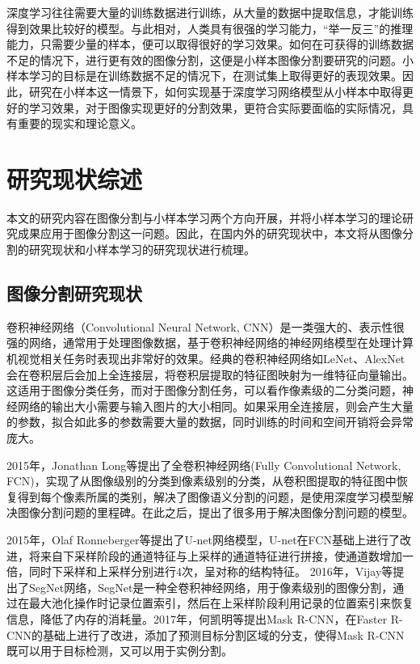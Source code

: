 \documentclass[AutoFakeBold]{LZUThesis}
\begin{document}
深度学习往往需要大量的训练数据进行训练，从大量的数据中提取信息，才能训练得到效果比较好的模型。与此相对，人类具有很强的学习能力，“举一反三”的推理能力，只需要少量的样本，便可以取得很好的学习效果。如何在可获得的训练数据不足的情况下，进行更有效的图像分割，这便是小样本图像分割要研究的问题。小样本学习的目标是在训练数据不足的情况下，在测试集上取得更好的表现效果。因此，研究在小样本这一情景下，如何实现基于深度学习网络模型从小样本中取得更好的学习效果，对于图像实现更好的分割效果，更符合实际要面临的实际情况，具有重要的现实和理论意义。


\section{研究现状综述}
本文的研究内容在图像分割与小样本学习两个方向开展，并将小样本学习的理论研究成果应用于图像分割这一问题。因此，在国内外的研究现状中，本文将从图像分割的研究现状和小样本学习的研究现状进行梳理。
\subsection{图像分割研究现状}
卷积神经网络（Convolutional Neural Network, CNN）是一类强大的、表示性很强的网络，通常用于处理图像数据，基于卷积神经网络的神经网络模型在处理计算机视觉相关任务时表现出非常好的效果。经典的卷积神经网络如LeNet\textsuperscript{\cite{lecun1989handwritten}}、AlexNet\textsuperscript{\cite{krizhevsky2012imagenet}}会在卷积层后会加上全连接层，将卷积层提取的特征图映射为一维特征向量输出。这适用于图像分类任务，而对于图像分割任务，可以看作像素级的二分类问题，神经网络的输出大小需要与输入图片的大小相同。如果采用全连接层，则会产生大量的参数，拟合如此多的参数需要大量的数据，同时训练的时间和空间开销将会异常庞大。

2015年，Jonathan Long等提出了全卷积神经网络(Fully Convolutional Network, FCN)\textsuperscript{\cite{long2015fully}}，实现了从图像级别的分类到像素级别的分类，从卷积图提取的特征图中恢复得到每个像素所属的类别，解决了图像语义分割的问题，是使用深度学习模型解决图像分割问题的里程碑。在此之后，提出了很多用于解决图像分割问题的模型\textsuperscript{\cite{minaee2021image}}。

2015年，Olaf Ronneberger等提出了U-net网络模型\textsuperscript{\cite{ronneberger2015u}}，U-net在FCN基础上进行了改进，将来自下采样阶段的通道特征与上采样的通道特征进行拼接，使通道数增加一倍，同时下采样和上采样分别进行4次，呈对称的结构特征。
2016年，Vijay等提出了SegNet网络\textsuperscript{\cite{badrinarayanan2017segnet}}，SegNet是一种全卷积神经网络，用于像素级别的图像分割，通过在最大池化操作时记录位置索引，然后在上采样阶段利用记录的位置索引来恢复信息，降低了内存的消耗量。2017年，何凯明等提出Mask R-CNN\textsuperscript{\cite{he2017mask}}，在Faster R-CNN\textsuperscript{\cite{ren2015faster}}的基础上进行了改进，添加了预测目标分割区域的分支，使得Mask R-CNN既可以用于目标检测，又可以用于实例分割。
\end{document}
